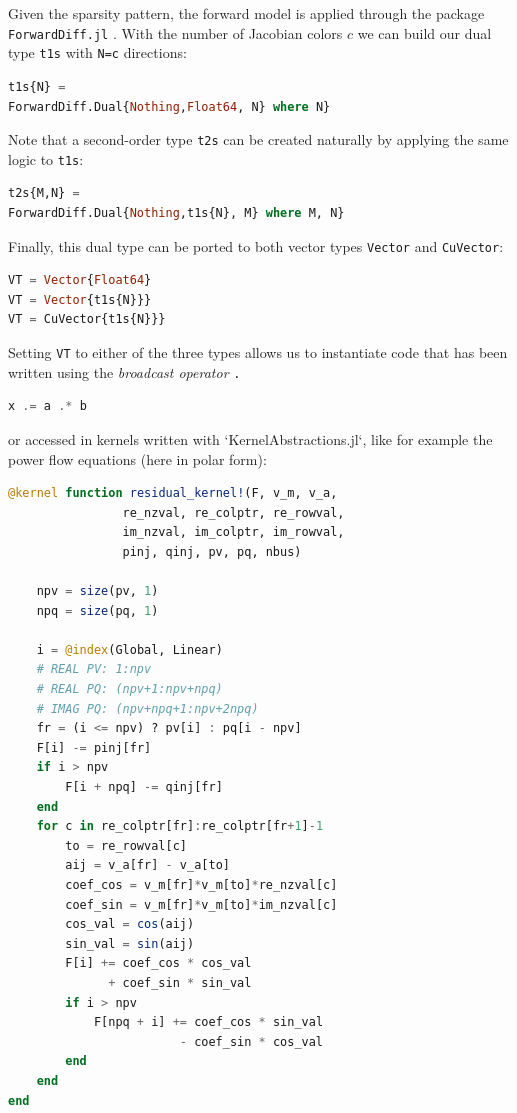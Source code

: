 \documentclass{juliacon}
\begin{document}
Given the sparsity pattern, the forward model is applied through the package
\lstinline{ForwardDiff.jl} \cite{RevelsLubinPapamarkou2016}. With the number of Jacobian
colors $c$ we can build our dual type \lstinline{t1s} with \lstinline{N=c} directions:

\begin{lstlisting}[language = Julia]
t1s{N} = 
ForwardDiff.Dual{Nothing,Float64, N} where N}
\end{lstlisting}

Note that a second-order type \lstinline{t2s} can be created naturally by applying the same logic to \lstinline{t1s}:

\begin{lstlisting}[language = Julia]
t2s{M,N} =  
ForwardDiff.Dual{Nothing,t1s{N}, M} where M, N}
\end{lstlisting}

Finally, this dual type can be ported to both vector types \lstinline{Vector} and \lstinline{CuVector}:

\begin{lstlisting}[language = Julia]
VT = Vector{Float64}
VT = Vector{t1s{N}}}
VT = CuVector{t1s{N}}}
\end{lstlisting}

Setting \lstinline{VT} to either of the three types allows us to instantiate code that has been written using the {\it broadcast operator} \lstinline{.}

\begin{lstlisting}[language = Julia]
x .= a .* b
\end{lstlisting}

or accessed in kernels written with `KernelAbstractions.jl`, like for example the power flow equations (here in polar form):

\begin{lstlisting}[language = Julia]
@kernel function residual_kernel!(F, v_m, v_a,
                re_nzval, re_colptr, re_rowval,
                im_nzval, im_colptr, im_rowval,
                pinj, qinj, pv, pq, nbus)

    npv = size(pv, 1)
    npq = size(pq, 1)

    i = @index(Global, Linear)
    # REAL PV: 1:npv
    # REAL PQ: (npv+1:npv+npq)
    # IMAG PQ: (npv+npq+1:npv+2npq)
    fr = (i <= npv) ? pv[i] : pq[i - npv]
    F[i] -= pinj[fr]
    if i > npv
        F[i + npq] -= qinj[fr]
    end
    for c in re_colptr[fr]:re_colptr[fr+1]-1
        to = re_rowval[c]
        aij = v_a[fr] - v_a[to]
        coef_cos = v_m[fr]*v_m[to]*re_nzval[c]
        coef_sin = v_m[fr]*v_m[to]*im_nzval[c]
        cos_val = cos(aij)
        sin_val = sin(aij)
        F[i] += coef_cos * cos_val 
              + coef_sin * sin_val
        if i > npv
            F[npq + i] += coef_cos * sin_val 
                        - coef_sin * cos_val
        end
    end
end
\end{lstlisting}
\end{document}
